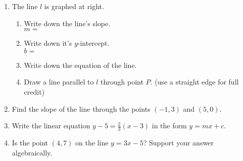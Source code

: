 \begin{enumerate}
\item The line $l$ is graphed at right.
  \begin{multicols}{2}
  \begin{enumerate}
    \item Write down the line's slope.\\ $m=$
    \vspace{0.5cm}
    \item Write down it's $y$-intercept.\\ $b=$
    \vspace{0.5cm}
    \item Write down the equation of the line.
    \vspace{1.5cm}
    \item Draw a line parallel to $l$ through point $P$. (use a straight edge for full credit)
  \end{enumerate} \vspace{.5cm}
    \begin{center} 
    \end{center}
  \end{multicols}
  
\item Find the slope of the line through the points $(-1, 3)$ and $(5, 0)$. \vspace{4cm}
  
\item Write the linear equation $\displaystyle y-5=\frac{2}{3}(x-3)$ in the form $y=mx+c$. \vspace{4cm}

\item Is the point $(4,7)$ on the line $y=3x-5$? Support your answer algebraically.
  

\end{enumerate}
